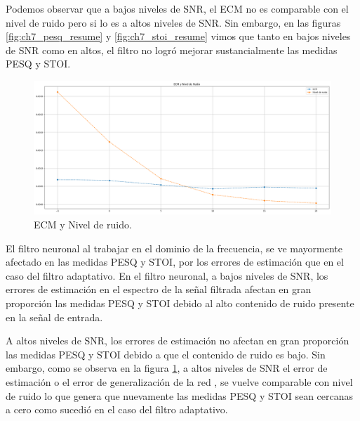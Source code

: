 Podemos observar que a bajos niveles de SNR, el ECM no es comparable con el nivel de ruido pero si lo es a altos niveles de SNR. Sin embargo, en las figuras \ref{fig:ch7_pesq_resume} y \ref{fig:ch7_stoi_resume} vimos que tanto en bajos niveles de SNR como en altos, el filtro no logró mejorar sustancialmente las medidas PESQ y STOI.

\begin{figure}
	\centering
	\centerline{\includegraphics[scale=0.30]{images/ch7/ecm_and_noise_level.png}}
	\caption{ECM y Nivel de ruido.}
	\label{fig:ch7_mse_and_noise_level}
\end{figure}


El filtro neuronal al trabajar en el dominio de la frecuencia, se ve mayormente afectado en las medidas PESQ y STOI, por los errores de estimación que en el caso del filtro adaptativo. En el filtro neuronal, a bajos niveles de SNR, los errores de estimación en el espectro de la señal filtrada  afectan en gran proporción las medidas PESQ y STOI debido al alto contenido de ruido presente en la señal de entrada.

A altos niveles de SNR, los errores de estimación no afectan en gran proporción las medidas PESQ y STOI debido a que el contenido de ruido es bajo. Sin embargo, como se observa en la figura \ref{fig:ch7_mse_and_noise_level}, a altos niveles de SNR el error de estimación o el error de generalización de la red \cite{deep_learning}, se vuelve comparable con nivel de ruido lo que genera que nuevamente las medidas PESQ y STOI sean cercanas a cero como sucedió en el caso del filtro adaptativo.
